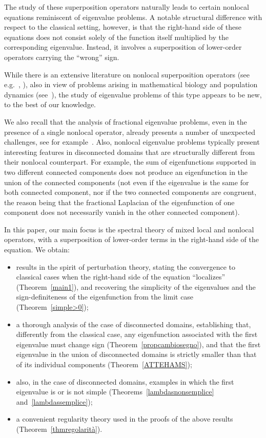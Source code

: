 \documentclass[12pt,a4paper,intlimits,sumlimits]{amsart}
\theoremstyle{definition}
\theoremstyle{plain}
\numberwithin{equation}{section}
\begin{document}
The study of these superposition operators naturally leads to certain nonlocal equations reminiscent of eigenvalue problems. A notable structural difference with respect to the classical setting, however, is that the right-hand side of these equations does not consist solely of the function itself multiplied by the corresponding eigenvalue. Instead, it involves a superposition of lower-order operators carrying the ``wrong'' sign.

While there is an extensive literature on nonlocal superposition operators
(see e.g.~\cite{MR2129093, MR2244602, MR2542727, MR2653895, MR2911421, MR2912450, MR3485125, MR4387204, MR4793906, MR4391102, DPSV2, MR4845869},  \cite{TUTTI, TUTTI2, TUTTI3}), also in view
of problems arising in mathematical biology and population dynamics
(see~\cite{MR4651677, MR4249816, DPLSVlog}),
the study of eigenvalue problems of this type appears to be new, to the best of our knowledge. 

We also recall that the analysis of fractional eigenvalue problems,
even in the presence of a single nonlocal operator, already presents a number of unexpected challenges, 
see for example~\cite{KASSIL}.
Also, nonlocal eigenvalue problems typically present interesting features in disconnected domains that are structurally different from their nonlocal counterpart. For example, the sum of eigenfunctions supported
in two different connected components does not produce an eigenfunction in the union of the connected components (not even if the eigenvalue is the same for both connected component, nor if the two connected components are congruent, the reason being that the fractional Laplacian of the eigenfunction of one component does not necessarily vanish in the other connected component).
\medskip

In this paper, our main focus is the spectral theory of mixed local and nonlocal operators, with a superposition of lower-order terms in the right-hand side of the equation. We obtain:
\begin{itemize}
\item results in the spirit of perturbation theory, stating the convergence to classical cases when the right-hand side of the equation ``localizes'' (Theorem~\ref{main1}), and recovering the simplicity of the eigenvalues and the sign-definiteness of the eigenfunction from the limit case (Theorem~\ref{simple>0});
\item a thorough analysis of the case of disconnected domains, establishing that, differently from the classical case, any eigenfunction associated with the first eigenvalue must change sign (Theorem~\ref{propcambiosegno}), and that the first eigenvalue in the union of disconnected domains is strictly smaller than that of its individual components (Theorem~\ref{ATTEHAMS});
\item also, in the case of disconnected domains, examples in which the first eigenvalue is or is not simple (Theorems~\ref{lambdasnonsemplice} and~\ref{lambdassemplice});
\item a convenient regularity theory used in the proofs of the above results (Theorem~\ref{thmregolarità}).
\end{itemize}
\medskip
\end{document}
